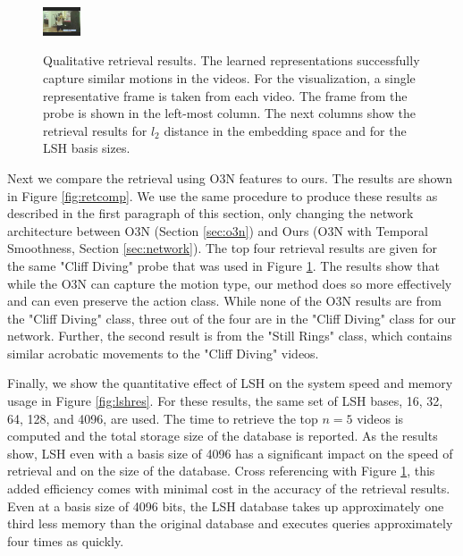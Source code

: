 \begin{figure}[t]
\begin{center}
\begin{tabu}
            \includegraphics[width=0.1\textwidth]{images/ret_results/2/16.png} \\ \hline            
        \end{tabu}
        \caption{Qualitative retrieval results. The learned representations successfully capture similar motions in the videos. For the visualization, a single representative frame is taken from each video. The frame from the probe is shown in the left-most column. The next columns show the retrieval results for $l_2$ distance in the embedding space and for the LSH basis sizes.  }
        \label{fig:retres}
    \end{center}
\end{figure}

Next we compare the retrieval using O3N features to ours. The results are shown in Figure \ref{fig:retcomp}. We use the same procedure to produce these results as described in the first paragraph of this section, only changing the network architecture between O3N (Section \ref{sec:o3n}) and Ours (O3N with Temporal Smoothness, Section \ref{sec:network}). The top four retrieval results are given for the same "Cliff Diving" probe that was used in Figure \ref{fig:retres}. The results show that while the O3N can capture the motion type, our method does so more effectively and can even preserve the action class. While none of the O3N results are from the "Cliff Diving" class, three out of the four are in the "Cliff Diving" class for our network. Further, the second result is from the "Still Rings" class, which contains similar acrobatic movements to the "Cliff Diving" videos.

Finally, we show the quantitative effect of LSH on the system speed and memory usage in Figure \ref{fig:lshres}. For these results, the same set of LSH bases, 16, 32, 64, 128, and 4096, are used. The time to retrieve the top $n=5$ videos is computed and the total storage size of the database is reported. As the results show, LSH even with a basis size of 4096 has a significant impact on the speed of retrieval and on the size of the database. Cross referencing with Figure \ref{fig:retres}, this added efficiency comes with minimal cost in the accuracy of the retrieval results. Even at a basis size of 4096 bits, the LSH database takes up approximately one third less memory than the original database and executes queries approximately four times as quickly.


